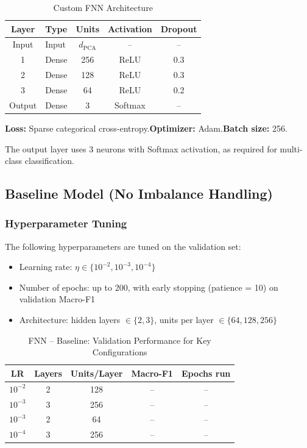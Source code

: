 \documentclass[12pt,a4paper]{article}
\begin{document}
\begin{table}[H]
    \centering
    \caption{Custom FNN Architecture}
    \label{tab:fnn_arch}
    \begin{tabular}{clccc}
        \toprule
        \textbf{Layer} & \textbf{Type} & \textbf{Units} & \textbf{Activation} & \textbf{Dropout} \\
        \midrule
        Input  & Input  & $d_{\text{PCA}}$ & --      & -- \\
        1      & Dense  & 256              & ReLU    & 0.3 \\
        2      & Dense  & 128              & ReLU    & 0.3 \\
        3      & Dense  & 64               & ReLU    & 0.2 \\
        Output & Dense  & 3                & Softmax & -- \\
        \bottomrule
    \end{tabular}
\end{table}

\noindent\textbf{Loss:} Sparse categorical cross-entropy.\quad\textbf{Optimizer:} Adam.\quad\textbf{Batch size:} 256.

\noindent The output layer uses 3 neurons with Softmax activation, as required for multi-class classification.

\subsection{Baseline Model (No Imbalance Handling)}

\subsubsection{Hyperparameter Tuning}

The following hyperparameters are tuned on the validation set:
\begin{itemize}
    \item Learning rate: $\eta \in \{10^{-2}, 10^{-3}, 10^{-4}\}$
    \item Number of epochs: up to 200, with early stopping (patience = 10) on validation Macro-F1
    \item Architecture: hidden layers $\in \{2, 3\}$, units per layer $\in \{64, 128, 256\}$
\end{itemize}

\begin{table}[H]
    \centering
    \caption{FNN -- Baseline: Validation Performance for Key Configurations}
    \label{tab:fnn_baseline_tuning}
    \begin{tabular}{ccccc}
        \toprule
        LR & Layers & Units/Layer & Macro-F1 & Epochs run \\
        \midrule
        $10^{-2}$ & 2 & 128 & -- & -- \\
        $10^{-3}$ & 3 & 256 & -- & -- \\
        $10^{-3}$ & 2 & 64  & -- & -- \\
        $10^{-4}$ & 3 & 256 & -- & -- \\
        \bottomrule
    \end{tabular}
\end{table}
\end{document}
